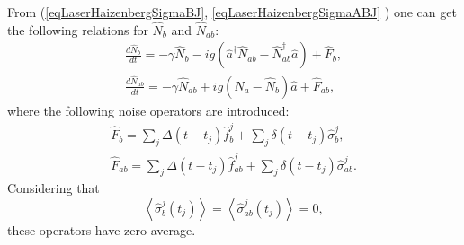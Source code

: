 From (\ref{eqLaserHaizenbergSigmaBJ},
\ref{eqLaserHaizenbergSigmaABJ} ) one can get the following relations for
$\hat{N}_b$ and $\hat{N}_{ab}$:
\begin{eqnarray}
\frac{d \hat{N}_b}{d t} = 
- \gamma \hat{N}_{b} -
i g 
 \left(
\hat{a}^{\dag}\hat{N}_{ab} -
\hat{N}_{ab}^{\dag}\hat{a}
\right) + \hat{F}_{b},
\nonumber \\
\frac{d \hat{N}_{ab}}{d t} = 
- \gamma \hat{N}_{ab} 
+ i g 
\left(\hat{N}_{a} -
\hat{N}_{b}\right)\hat{a} 
 + \hat{F}_{ab},
\label{eqLaserHaizenberNB_AB}
\end{eqnarray}
where the following noise operators are introduced:
\begin{eqnarray}
\hat{F}_{b} = \sum_j\Delta\left(t - t_j\right)\hat{f}^{j}_{b} + \sum_j
\delta\left(t - t_j\right)\hat{\sigma}^{j}_{b}, 
\nonumber \\
\hat{F}_{ab} = \sum_j\Delta\left(t - t_j\right)\hat{f}^{j}_{ab} +
\sum_j \delta\left(t - t_j\right)\hat{\sigma}^{j}_{ab}. 
\label{eqLaserHaizenbergFB_AB}
\end{eqnarray}
Considering that
\[
\left<\hat{\sigma}^{j}_{b}\left(t_j\right)\right> = 
\left<\hat{\sigma}^{j}_{ab}\left(t_j\right)\right> = 0,
\]
these operators have zero average.

